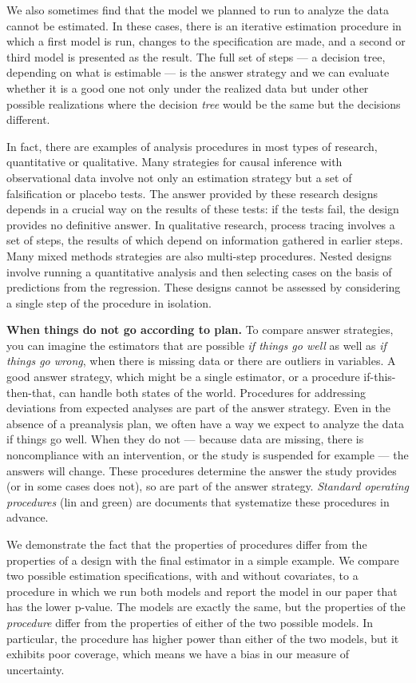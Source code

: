 \documentclass[
]{article}
\begin{document}
We also sometimes find that the model we planned to run to analyze the
data cannot be estimated. In these cases, there is an iterative
estimation procedure in which a first model is run, changes to the
specification are made, and a second or third model is presented as the
result. The full set of steps --- a decision tree, depending on what is
estimable --- is the answer strategy and we can evaluate whether it is a
good one not only under the realized data but under other possible
realizations where the decision \emph{tree} would be the same but the
decisions different.

In fact, there are examples of analysis procedures in most types of
research, quantitative or qualitative. Many strategies for causal
inference with observational data involve not only an estimation
strategy but a set of falsification or placebo tests. The answer
provided by these research designs depends in a crucial way on the
results of these tests: if the tests fail, the design provides no
definitive answer. In qualitative research, process tracing involves a
set of steps, the results of which depend on information gathered in
earlier steps. Many mixed methods strategies are also multi-step
procedures. Nested designs involve running a quantitative analysis and
then selecting cases on the basis of predictions from the regression.
These designs cannot be assessed by considering a single step of the
procedure in isolation.

\textbf{When things do not go according to plan.} To compare answer
strategies, you can imagine the estimators that are possible \emph{if
things go well} as well as \emph{if things go wrong}, when there is
missing data or there are outliers in variables. A good answer strategy,
which might be a single estimator, or a procedure if-this-then-that, can
handle both states of the world. Procedures for addressing deviations
from expected analyses are part of the answer strategy. Even in the
absence of a preanalysis plan, we often have a way we expect to analyze
the data if things go well. When they do not --- because data are
missing, there is noncompliance with an intervention, or the study is
suspended for example --- the answers will change. These procedures
determine the answer the study provides (or in some cases does not), so
are part of the answer strategy. \emph{Standard operating procedures}
(lin and green) are documents that systematize these procedures in
advance.

We demonstrate the fact that the properties of procedures differ from
the properties of a design with the final estimator in a simple example.
We compare two possible estimation specifications, with and without
covariates, to a procedure in which we run both models and report the
model in our paper that has the lower p-value. The models are exactly
the same, but the properties of the \emph{procedure} differ from the
properties of either of the two possible models. In particular, the
procedure has higher power than either of the two models, but it
exhibits poor coverage, which means we have a bias in our measure of
uncertainty.
\end{document}
